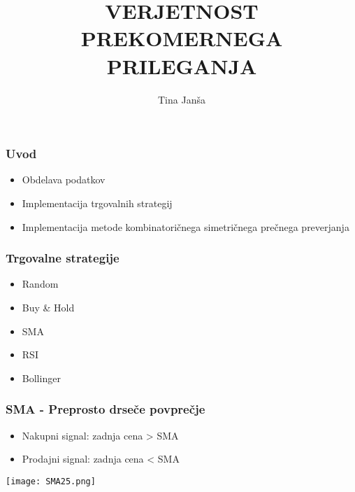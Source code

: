 \documentclass{beamer}
\title[Verjetnost prekomernega prileganja]{VERJETNOST PREKOMERNEGA PRILEGANJA}
\author[Tina Janša]{Tina Janša}
\begin{document}
\begin{frame}
\titlepage
\end{frame}


\begin{frame}
\frametitle{Uvod}

\begin{itemize}
\item Obdelava podatkov \pause
\item Implementacija trgovalnih strategij 
\item Implementacija metode kombinatoričnega simetričnega prečnega preverjanja
\end{itemize}

\end{frame}



\begin{frame}
\frametitle{Trgovalne strategije}
\begin{itemize}
\item Random
\item Buy \& Hold
\item SMA
\item RSI
\item Bollinger
\end{itemize}
\end{frame}


\begin{frame}
\frametitle{SMA - Preprosto drseče povprečje}
\begin{itemize}
\item Nakupni signal: zadnja cena > SMA
\item Prodajni signal: zadnja cena < SMA
\end{itemize}

\texttt{[image: SMA25.png]}

\end{frame}
\end{document}

